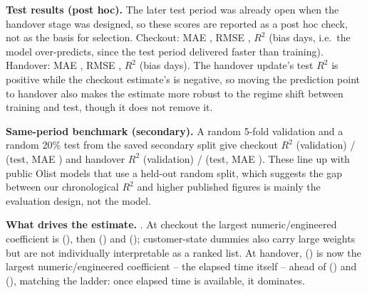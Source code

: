 \documentclass[12pt,a4paper]{article}
\begin{document}
\textbf{Test results (post hoc).} The later test period was already open when the handover stage was designed, so these scores are reported as a post hoc check, not as the basis for selection. Checkout: MAE \CheckoutTestMAE{}, RMSE \CheckoutTestRMSE{}, \(R^2\) \CheckoutTestRSq{} (bias \CheckoutTestBias{} days, i.e.\ the model over-predicts, since the test period delivered faster than training). Handover: MAE \HandoverTestMAE{}, RMSE \HandoverTestRMSE{}, \(R^2\) \HandoverTestRSq{} (bias \HandoverTestBias{} days). The handover update's test \(R^2\) is positive while the checkout estimate's is negative, so moving the prediction point to handover also makes the estimate more robust to the regime shift between training and test, though it does not remove it.

\textbf{Same-period benchmark (secondary).} A random 5-fold validation and a random 20\% test from the saved secondary split give checkout \(R^2\) \CheckoutRandValRSq{} (validation) / \CheckoutRandTestRSq{} (test, MAE \CheckoutRandTestMAE{}) and handover \(R^2\) \HandoverRandValRSq{} (validation) / \HandoverRandTestRSq{} (test, MAE \HandoverRandTestMAE{}). These line up with public Olist models that use a held-out random split, which suggests the gap between our chronological \(R^2\) and higher published figures is mainly the evaluation design, not the model.

\textbf{What drives the estimate.} \CheckoutImpKind{}. At checkout the largest numeric/engineered coefficient is \texttt{\CheckoutImpAName{}} (\CheckoutImpAVal{}), then \texttt{\CheckoutImpBName{}} (\CheckoutImpBVal{}) and \texttt{\CheckoutImpCName{}} (\CheckoutImpCVal{}); customer-state dummies also carry large weights but are not individually interpretable as a ranked list. At handover, \texttt{\HandoverImpAName{}} (\HandoverImpAVal{}) is now the largest numeric/engineered coefficient -- the elapsed time itself -- ahead of \texttt{\HandoverImpBName{}} (\HandoverImpBVal{}) and \texttt{\HandoverImpCName{}} (\HandoverImpCVal{}), matching the ladder: once elapsed time is available, it dominates.
\end{document}
